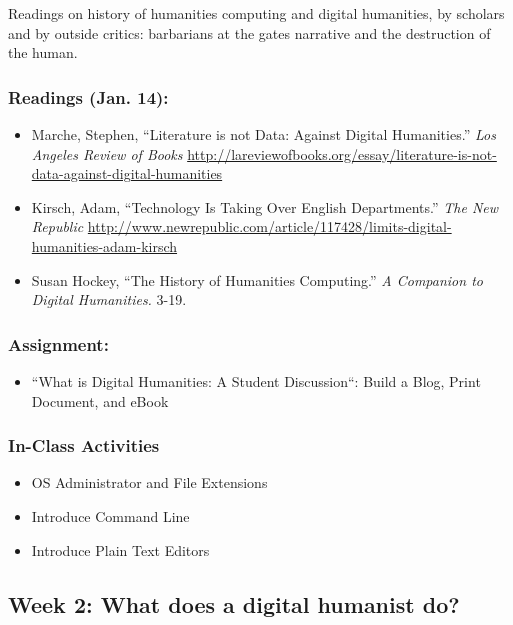 \documentclass[]{article}
\begin{document}
Readings on history of humanities computing and digital humanities, by
scholars and by outside critics: barbarians at the gates narrative and
the destruction of the human.

\subsubsection{Readings (Jan. 14):}\label{readings-jan.-14}

\begin{itemize}
\itemsep1pt\parskip0pt
\item
  Marche, Stephen, ``Literature is not Data: Against Digital
  Humanities.'' \emph{Los Angeles Review of Books}
  \url{http://lareviewofbooks.org/essay/literature-is-not-data-against-digital-humanities}
\item
  Kirsch, Adam, ``Technology Is Taking Over English Departments.''
  \emph{The New Republic}
  \url{http://www.newrepublic.com/article/117428/limits-digital-humanities-adam-kirsch}
\item
  Susan Hockey, ``The History of Humanities Computing.'' \emph{A
  Companion to Digital Humanities.} 3-19.
\end{itemize}

\subsubsection{Assignment:}\label{assignment}

\begin{itemize}
\itemsep1pt\parskip0pt
\item
  ``What is Digital Humanities: A Student Discussion``: Build a Blog,
  Print Document, and eBook
\end{itemize}

\subsubsection{In-Class Activities}\label{in-class-activities}

\begin{itemize}
\itemsep1pt\parskip0pt
\item
  OS Administrator and File Extensions
\item
  Introduce Command Line
\item
  Introduce Plain Text Editors
\end{itemize}

\subsection{Week 2: What does a digital humanist
do?}\label{week-2-what-does-a-digital-humanist-do}
\end{document}
